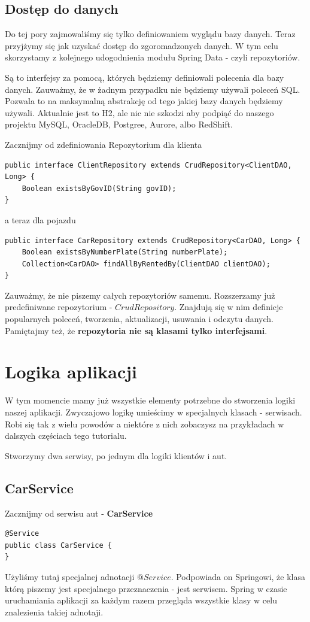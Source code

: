 \documentclass{article}
\begin{document}
        \subsection{Dostęp do danych}
            Do tej pory zajmowaliśmy się tylko definiowaniem wyglądu bazy danych. Teraz przyjżymy się jak uzyskać dostęp do zgoromadzonych danych. W tym celu skorzystamy z kolejnego udogodnienia modułu Spring Data - czyli repozytoriów. 
            
            Są to interfejsy za pomocą, których będziemy definiowali polecenia dla bazy danych. Zauważmy, że w żadnym przypadku nie będziemy używali poleceń SQL. Pozwala to na maksymalną abstrakcję od tego jakiej bazy danych będziemy używali. Aktualnie jest to H2, ale nic nie szkodzi aby podpiąć do naszego projektu MySQL, OracleDB, Postgree, Aurore, albo RedShift.
            
            Zacznijmy od zdefiniowania Repozytorium dla klienta
            \begin{verbatim}
public interface ClientRepository extends CrudRepository<ClientDAO, Long> {
    Boolean existsByGovID(String govID);
}
            \end{verbatim}
            a teraz dla pojazdu
            \begin{verbatim}
public interface CarRepository extends CrudRepository<CarDAO, Long> {
    Boolean existsByNumberPlate(String numberPlate);
    Collection<CarDAO> findAllByRentedBy(ClientDAO clientDAO);
}
            \end{verbatim}
            Zauważmy, że nie piszemy całych repozytoriów samemu. Rozszerzamy już predefiniwane repozytorium - $CrudRepository$. Znajdują się w nim definicje popularnych poleceń, tworzenia, aktualizacji, usuwania i odczytu danych. Pamiętajmy też, że \textbf{repozytoria nie są klasami tylko interfejsami}. 
    \section{Logika aplikacji}
        W tym momencie mamy już wszystkie elementy potrzebne do stworzenia logiki naszej aplikacji. Zwyczajowo logikę umieścimy w specjalnych klasach - serwisach. Robi się tak z wielu powodów a niektóre z nich zobaczysz na przykładach w dalszych częściach tego tutorialu. 
        
        Stworzymy dwa serwisy, po jednym dla logiki klientów i aut. 
        \subsection{CarService}
        Zacznijmy od serwisu aut - \textbf{CarService}
        \begin{verbatim}
@Service
public class CarService {
}
        \end{verbatim}
        Użyliśmy tutaj specjalnej adnotacji $@Service$. Podpowiada on Springowi, że klasa którą piszemy jest specjalnego przeznaczenia - jest serwisem. Spring w czasie uruchamiania aplikacji za każdym razem przegląda wszystkie klasy w celu znalezienia takiej adnotaji. 
        
\end{document}

